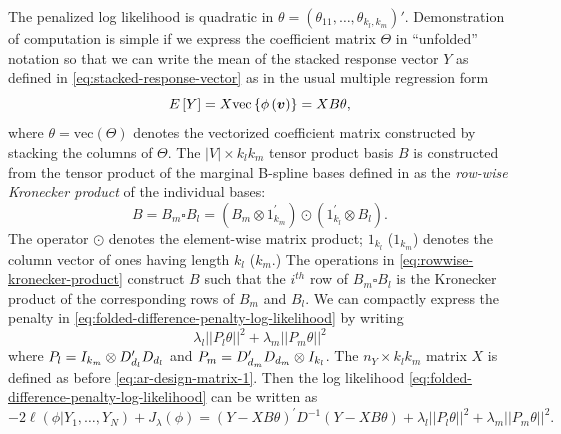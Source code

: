 The penalized log likelihood is quadratic in $\theta = \left(\theta_{11}, \dots, \theta_{k_l, k_m} \right)'$. Demonstration of computation is simple if we express the coefficient matrix $\Theta$ in ``unfolded'' notation so that we can write the mean of the stacked response vector $Y$ as defined in \eqref{eq:stacked-response-vector} as in the usual multiple regression form
\begin{equation*}
E\left[Y \right] = X\mbox{vec}\left\{\phi\left( \mbox{\boldmath $v$} \right)\right\} = X B \theta,
\end{equation*}
\noindent
where $\theta = \mbox{vec}\left( \Theta \right)$ denotes the vectorized coefficient matrix constructed by stacking the columns of $\Theta$. The $\vert V \vert \times k_l k_m$ tensor product basis $B$ is constructed from the tensor product of the marginal B-spline bases defined in \citet{eilers2006fast} as the \textit{row-wise Kronecker product} of the individual bases:
\begin{equation} \label{eq:rowwise-kronecker-product}
B = B_m \square B_l = \left( B_m \otimes 1^\prime_{k_m} \right) \odot \left(1^\prime_{k_l} \otimes  B_l  \right).
\end{equation}
\noindent
The operator $\odot$ denotes the element-wise matrix product; $1_{k_l}$ ($1_{k_m}$) denotes the column vector of ones having length $k_l$ ($k_m$.) The operations in \eqref{eq:rowwise-kronecker-product} construct $B$ such that the $i^{th}$ row of $B_m\square B_l$ is the Kronecker product of the corresponding rows of $B_m$ and $B_l$. We can compactly express the penalty in \eqref{eq:folded-difference-penalty-log-likelihood} by writing
\begin{equation*} \label{eq:tensor-product-penalty}
\lambda_l \vert \vert P_l \theta \vert \vert^2 + \lambda_m \vert \vert P_m \theta \vert\vert^2
\end{equation*}
\noindent
where $P_l = I_{k_m} \otimes D'_{d_{\scriptscriptstyle l}} D_{d_{\scriptscriptstyle l}} $ and $P_m =  D'_{d_{\scriptscriptstyle m}} D_{d_{\scriptscriptstyle m}} \otimes I_{k_l}$. The $n_Y \times k_lk_m$  matrix $X$ is defined as before \eqref{eq:ar-design-matrix-1}. Then the log likelihood \eqref{eq:folded-difference-penalty-log-likelihood} can be written as
\begin{equation} \label{eq:tensor-pspline-objective-function}
-2\ell\left(\phi \vert Y_1,\dots, Y_N\right) + J_{\lambda}\left(\phi\right) = \left( Y - XB\theta\right)^\prime D^{-1}\left( Y - XB\theta\right)  + \lambda_l\vert\vert P_l \theta \vert\vert^2 + \lambda_m \vert\vert P_m \theta\vert \vert^2.
\end{equation}
